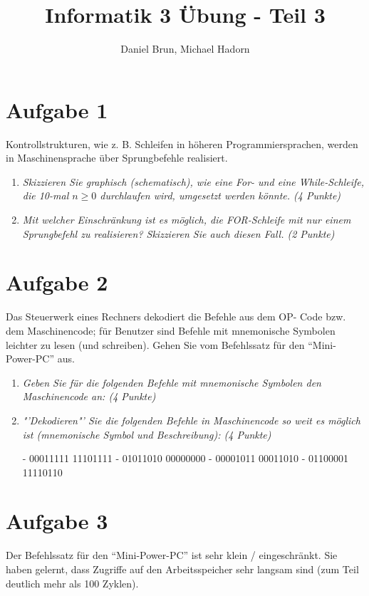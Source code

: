 \documentclass[10pt]{article}
\title{Informatik 3 Übung - Teil 3\vspace{-2ex}}
\author{Daniel Brun, Michael Hadorn\vspace{-2ex}}
\begin{document}
\maketitle

\section*{Aufgabe 1}
Kontrollstrukturen, wie z. B. Schleifen in höheren Programmiersprachen, werden in Maschinensprache über Sprungbefehle realisiert.
\begin{enumerate}[label=\alph*)]
	\item
		\textit{Skizzieren Sie graphisch (schematisch), wie eine For- und eine While-Schleife, die 10-mal \(n \ge 0\) durchlaufen wird, umgesetzt werden könnte. (4 Punkte)}
	
	
	\item
		\textit{Mit welcher Einschränkung ist es möglich, die FOR-Schleife mit nur einem Sprungbefehl zu realisieren? Skizzieren Sie auch diesen Fall. (2 Punkte)}
			
			
\end{enumerate}


\section*{Aufgabe 2}
Das Steuerwerk eines Rechners dekodiert die Befehle aus dem OP- Code bzw. dem Maschinencode; für Benutzer sind Befehle mit mnemonische Symbolen leichter zu lesen (und schreiben). Gehen Sie vom Befehlssatz für den "`Mini-Power-PC"' aus.
\begin{enumerate}[label=\alph*)]
	\item
		\textit{Geben Sie für die folgenden Befehle mit mnemonische Symbolen den Maschinencode an: (4 Punkte)}


	
	\item
		\textit{"'Dekodieren"' Sie die folgenden Befehle in Maschinencode so weit es möglich ist (mnemonische Symbol und Beschreibung): (4 Punkte)}

		- 00011111 11101111
		- 01011010 00000000
		- 00001011 00011010
		- 01100001 11110110

\end{enumerate}

\section*{Aufgabe 3}
Der Befehlssatz für den "`Mini-Power-PC"' ist sehr klein / eingeschränkt. Sie haben gelernt, dass Zugriffe auf den Arbeitsspeicher sehr langsam sind (zum Teil deutlich mehr als 100 Zyklen).
\end{document}

